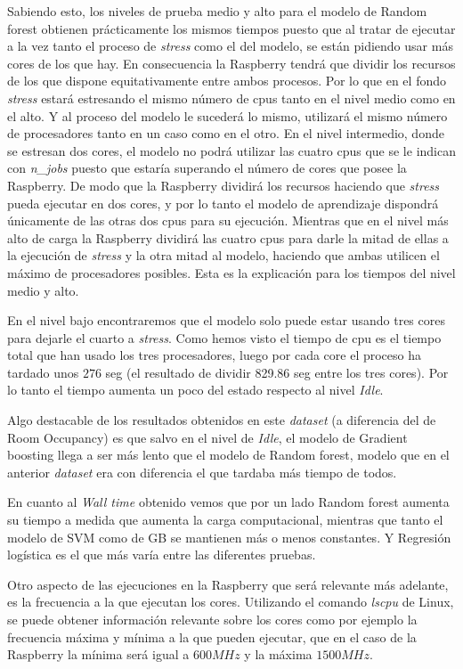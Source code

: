 \documentclass[a4paper, 12pt]{book}
\begin{document}
Sabiendo esto, los niveles de prueba medio y alto para el modelo de Random forest obtienen prácticamente los mismos tiempos puesto que al tratar de ejecutar a la vez tanto el proceso de \textit{stress} como el del modelo, se están pidiendo usar más cores de los que hay. En consecuencia la Raspberry tendrá que dividir los recursos de los que dispone equitativamente entre ambos procesos. Por lo que en el fondo \textit{stress} estará estresando el mismo número de cpus tanto en el nivel medio como en el alto. Y al proceso del modelo le sucederá lo mismo, utilizará el mismo número de procesadores tanto en un caso como en el otro. En el nivel intermedio, donde se estresan dos cores, el modelo no podrá utilizar las cuatro cpus que se le indican con \textit{n\_jobs} puesto que estaría superando el número de cores que posee la Raspberry. De modo que la Raspberry dividirá los recursos haciendo que \textit{stress} pueda ejecutar en dos cores, y por lo tanto el modelo de aprendizaje dispondrá únicamente de las otras dos cpus para su ejecución. Mientras que en el nivel más alto de carga la Raspberry dividirá las cuatro cpus para darle la mitad de ellas a la ejecución de \textit{stress} y la otra mitad al modelo, haciendo que ambas utilicen el máximo de procesadores posibles. Esta es la explicación para los tiempos del nivel medio y alto. 

En el nivel bajo encontraremos que el modelo solo puede estar usando tres cores para dejarle el cuarto a \textit{stress}. Como hemos visto el tiempo de cpu es el tiempo total que han usado los tres procesadores, luego por cada core el proceso ha tardado unos $276$ seg (el resultado de dividir 829.86 seg entre los tres cores). Por lo tanto el tiempo aumenta un poco del estado respecto al nivel \textit{Idle}.

Algo destacable de los resultados obtenidos en este \textit{dataset} (a diferencia del de Room Occupancy) es que salvo en el nivel de \textit{Idle}, el modelo de Gradient boosting llega a ser más lento que el modelo de Random forest, modelo que en el anterior \textit{dataset} era con diferencia el que tardaba más tiempo de todos.

En cuanto al \textit{Wall time} obtenido vemos que por un lado Random forest aumenta su tiempo a medida que aumenta la carga computacional, mientras que tanto el modelo de SVM como de GB se mantienen más o menos constantes. Y  Regresión logística es el que más varía entre las diferentes pruebas.

Otro aspecto de las ejecuciones en la Raspberry  que será relevante más adelante, es la frecuencia a la que ejecutan los cores. Utilizando el comando \textit{lscpu} de Linux, se puede obtener información relevante sobre los cores como por ejemplo la frecuencia máxima y mínima a la que pueden ejecutar, que en el caso de la Raspberry la mínima será igual a $600MHz$ y la máxima $1500MHz$. 
\end{document}
